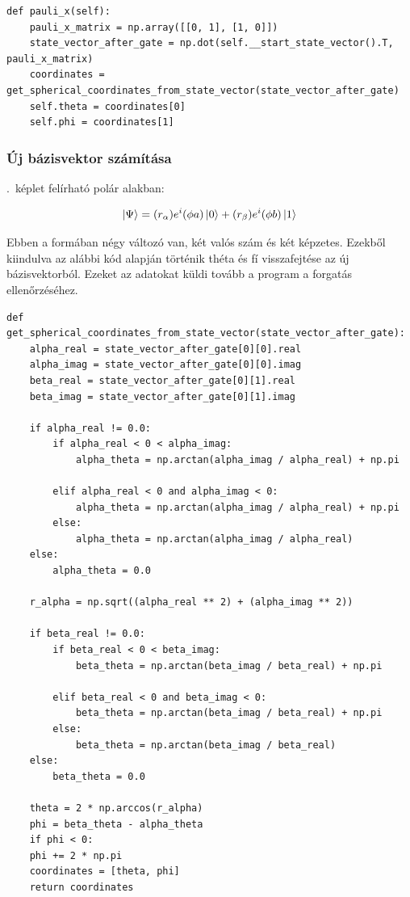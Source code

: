 \documentclass[
]{thesis-ekf}
\theoremstyle{definition}
\theoremstyle{remark}
\begin{document}
\begin{lstlisting}[caption={Pauli-X kapu alkalmazása a bázisvektorra}]
def pauli_x(self):
	pauli_x_matrix = np.array([[0, 1], [1, 0]])
	state_vector_after_gate = np.dot(self.__start_state_vector().T, pauli_x_matrix)
	coordinates = get_spherical_coordinates_from_state_vector(state_vector_after_gate)
	self.theta = coordinates[0]
	self.phi = coordinates[1]
\end{lstlisting}

\subsubsection{Új bázisvektor számítása}
\Az{\ref{qubitallapot}}.~képlet felírható polár alakban:

\begin{equation}
	\ket{\Psi}=(r_\alpha)e^i(\phi a)\ket{0}+(r_\beta)e^i(\phi b)\ket{1}
\end{equation}

Ebben a formában négy változó van, két valós szám és két képzetes. Ezekből kiindulva az alábbi kód alapján történik théta és fí visszafejtése az új bázisvektorból. Ezeket az adatokat küldi tovább a program a forgatás ellenőrzéséhez.\cite{github}

\begin{lstlisting}[caption={Fí és théta kinyerése az új bázisvektorból}]
def get_spherical_coordinates_from_state_vector(state_vector_after_gate):
	alpha_real = state_vector_after_gate[0][0].real
	alpha_imag = state_vector_after_gate[0][0].imag
	beta_real = state_vector_after_gate[0][1].real
	beta_imag = state_vector_after_gate[0][1].imag
	
	if alpha_real != 0.0:
		if alpha_real < 0 < alpha_imag:
			alpha_theta = np.arctan(alpha_imag / alpha_real) + np.pi
	
		elif alpha_real < 0 and alpha_imag < 0:
			alpha_theta = np.arctan(alpha_imag / alpha_real) + np.pi
		else:
			alpha_theta = np.arctan(alpha_imag / alpha_real)
	else:
		alpha_theta = 0.0
	
	r_alpha = np.sqrt((alpha_real ** 2) + (alpha_imag ** 2))
	
	if beta_real != 0.0:
		if beta_real < 0 < beta_imag:
			beta_theta = np.arctan(beta_imag / beta_real) + np.pi
	
		elif beta_real < 0 and beta_imag < 0:
			beta_theta = np.arctan(beta_imag / beta_real) + np.pi
		else:
			beta_theta = np.arctan(beta_imag / beta_real)
	else:
		beta_theta = 0.0
	
	theta = 2 * np.arccos(r_alpha)
	phi = beta_theta - alpha_theta
	if phi < 0:
	phi += 2 * np.pi
	coordinates = [theta, phi]
	return coordinates
\end{lstlisting}
\end{document}
